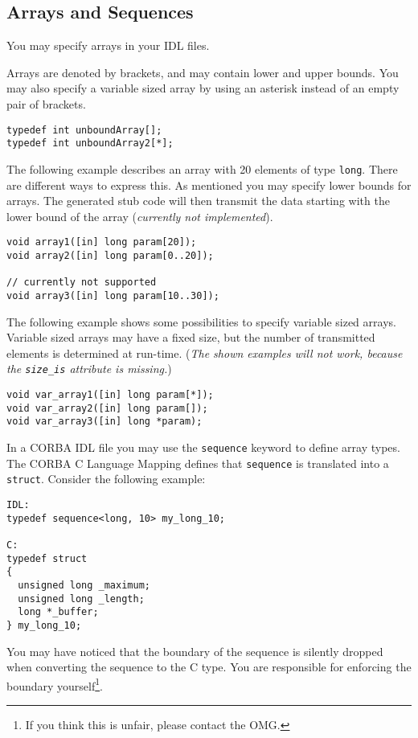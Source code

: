 \subsection{Arrays and Sequences}
You may specify arrays in your IDL files.

Arrays are denoted by brackets, and may contain lower and upper bounds.  You
may also specify a variable sized array by using an asterisk instead of an
empty pair of brackets.

\begin{verbatim}
typedef int unboundArray[];
typedef int unboundArray2[*];
\end{verbatim}

The following example describes an array with 20 elements of type \verb|long|.
There are different ways to express this. As mentioned you may specify lower
bounds for arrays. The generated stub code will then transmit the data
starting with the lower bound of the array ({\em currently not implemented}). 

\begin{verbatim}
void array1([in] long param[20]);
void array2([in] long param[0..20]);

// currently not supported
void array3([in] long param[10..30]);
\end{verbatim}

The following example shows some possibilities to specify variable
sized arrays. Variable sized arrays may have a fixed size, but the 
number of transmitted elements is determined at run-time. ({\em The
shown examples will not work, because the \verb|size_is| attribute
is missing.})

\begin{verbatim}
void var_array1([in] long param[*]);
void var_array2([in] long param[]);
void var_array3([in] long *param);
\end{verbatim}

In a CORBA IDL file you may use the {\tt sequence} keyword to define
array types. The CORBA C Language Mapping defines that {\tt sequence}
is translated into a {\tt struct}. Consider the following example:
\begin{verbatim}
IDL:
typedef sequence<long, 10> my_long_10;

C:
typedef struct
{
  unsigned long _maximum;
  unsigned long _length;
  long *_buffer;
} my_long_10;
\end{verbatim}

You may have noticed that the boundary of the sequence is silently dropped
when converting the sequence to the C type. You are responsible for enforcing
the boundary yourself\footnote{If you think this is unfair, please contact the
OMG.}.

